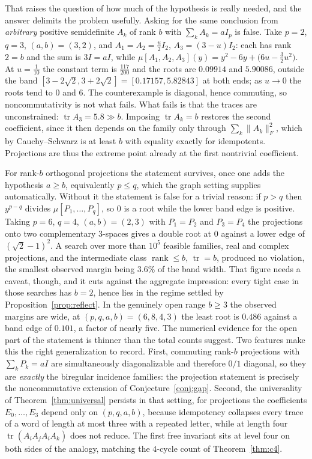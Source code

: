 \documentclass[11pt]{article}
\theoremstyle{remark}
\begin{document}
That raises the question of how much of the hypothesis is really needed, and the
answer delimits the problem usefully. Asking for the same conclusion from
\emph{arbitrary} positive semidefinite $A_k$ of rank $b$ with $\sum_kA_k=aI_p$ is
false. Take $p=2$, $q=3$, $(a,b)=(3,2)$, and
$A_1=A_2=\tfrac u2I_2$, $A_3=(3-u)I_2$: each has rank $2=b$ and the sum is $3I=aI$,
while $\mu[A_1,A_2,A_3](y)=y^2-6y+\bigl(6u-\tfrac32u^2\bigr)$. At $u=\tfrac1{10}$
the constant term is $\tfrac{117}{200}$ and the roots are $0.09914$ and $5.90086$,
outside the band $[3-2\sqrt2,3+2\sqrt2]=[0.17157,5.82843]$ at both ends; as
$u\to0$ the roots tend to $0$ and $6$. The counterexample is diagonal, hence
commuting, so noncommutativity is not what fails. What fails is that the traces
are unconstrained: $\operatorname{tr}A_3=5.8\gg b$. Imposing
$\operatorname{tr}A_k=b$ restores the second coefficient, since it then depends on
the family only through $\sum_k\|A_k\|_F^2$, which by Cauchy--Schwarz is at least
$b$ with equality exactly for idempotents. Projections are thus the extreme point
already at the first nontrivial coefficient.

For rank-$b$ orthogonal projections the statement survives, once one adds the
hypothesis $a\ge b$, equivalently $p\le q$, which the graph setting supplies
automatically. Without it the statement is false for a trivial reason: if $p>q$
then $y^{p-q}$ divides $\mu[P_1,\dots,P_q]$, so $0$ is a root while the lower band
edge is positive. Taking $p=6$, $q=4$, $(a,b)=(2,3)$ with $P_1=P_2$ and $P_3=P_4$
the projections onto two complementary $3$-spaces gives a double root at $0$
against a lower edge of $(\sqrt2-1)^2$. A search over more than
$10^5$ feasible families, real and complex projections, and the intermediate
class $\operatorname{rank}\le b$, $\operatorname{tr}=b$, produced no violation,
the smallest observed margin being $3.6\%$ of the band width. That figure needs a
caveat, though, and it cuts against the aggregate impression: every tight case in
those searches has $b=2$, hence lies in the regime settled by
Proposition~\ref{prop:reflect}. In the genuinely open range $b\ge3$ the observed
margins are wide, at $(p,q,a,b)=(6,8,4,3)$ the least root is $0.486$ against a
band edge of $0.101$, a factor of nearly five. The numerical evidence for the open
part of the statement is thinner than the total counts suggest. Two features make
this the right generalization to record. First, commuting rank-$b$ projections with
$\sum_kP_k=aI$ are simultaneously diagonalizable and therefore $0/1$ diagonal, so
they are \emph{exactly} the biregular incidence families: the projection statement
is precisely the noncommutative extension of Conjecture~\ref{conj:gap}. Second, the
universality of Theorem~\ref{thm:universal} persists in that setting, for
projections the coefficients $E_0,\dots,E_3$ depend only on $(p,q,a,b)$, because
idempotency collapses every trace of a word of length at most three with a repeated
letter, while at length four $\operatorname{tr}(A_iA_jA_iA_k)$ does not reduce. The
first free invariant sits at level four on both sides of the analogy, matching the
$4$-cycle count of Theorem~\ref{thm:c4}.
\end{document}
